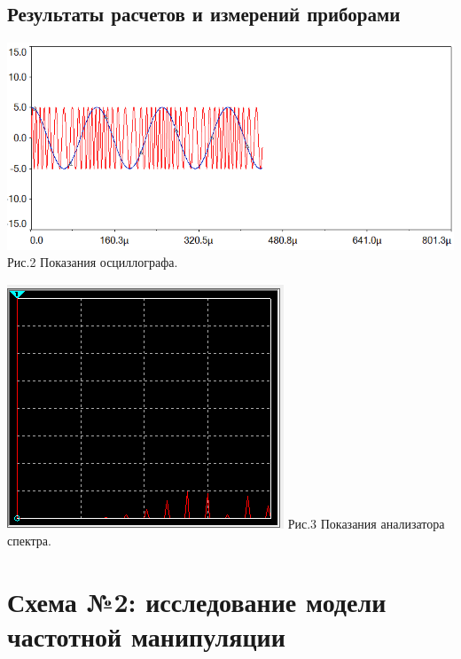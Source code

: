 \documentclass[11pt]{article}
\begin{document}
\subsection{Результаты расчетов и измерений приборами}
\begin{center}
    \includegraphics[width=1\linewidth]{img/osc1.png}
        Рис.2 Показания осциллографа.
\end{center}

\begin{center}
    \includegraphics[width=1\linewidth]{img/chast1.png}
        Рис.3 Показания анализатора спектра.
\end{center}


\newpage
\section{Схема №2: исследование модели частотной манипуляции}
\end{document}
